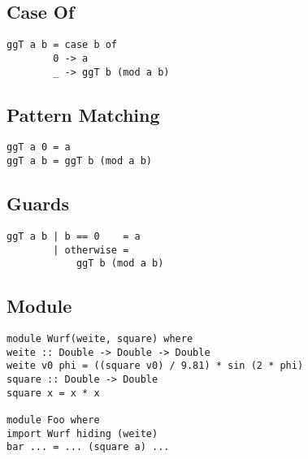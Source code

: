 \documentclass[
  10pt,                   %
  DIV12,
  german,                 %
  oneside,                %
  parskip=half,           %
  headings=normal,        %
  captions=tableheading,  %
]{scrartcl}
\begin{document}
\subsection{Case Of}
\begin{minipage}[hbt]{6cm}
\centering
\begin{lstlisting}
ggT a b = case b of 
        0 -> a
        _ -> ggT b (mod a b)
\end{lstlisting}
\end{minipage}
\hfill
\begin{minipage}[hbt]{8cm}
\centering
\scalebox{0.8}{}
\end{minipage}

\subsection{Pattern Matching}
\begin{minipage}[hbt]{6cm}
\centering
\begin{lstlisting}
ggT a 0 = a
ggT a b = ggT b (mod a b)
\end{lstlisting}
\end{minipage}
\hfill
\begin{minipage}[hbt]{8cm}
\centering
\scalebox{0.8}{}
\end{minipage}

\subsection{Guards}
\begin{minipage}[hbt]{6cm}
\centering
\begin{lstlisting}
ggT a b | b == 0    = a
        | otherwise = 
            ggT b (mod a b) 
\end{lstlisting}
\end{minipage}
\hfill
\begin{minipage}[hbt]{8cm}
\centering
\scalebox{0.8}{}
\end{minipage}

\subsection{Module}
\begin{lstlisting}
module Wurf(weite, square) where
weite :: Double -> Double -> Double
weite v0 phi = ((square v0) / 9.81) * sin (2 * phi)
square :: Double -> Double
square x = x * x

module Foo where
import Wurf hiding (weite)
bar ... = ... (square a) ...
\end{lstlisting}
\end{document}
